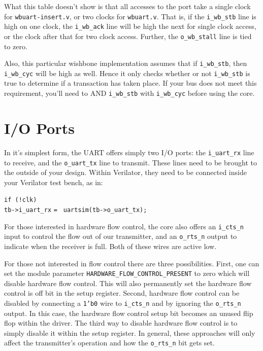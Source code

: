 \documentclass{gqtekspec}
\begin{document}
What this table doesn't show is that all accesses to the port take a single
clock for {\tt wbuart-insert.v}, or two clocks for {\tt wbuart.v}.  That is, if
the {\tt i\_wb\_stb} line is high on one clock, the {\tt i\_wb\_ack} line will
be high the next for single clock access, or the clock after that for two
clock access.  Further, the {\tt o\_wb\_stall} line is tied to zero.

Also, this particular wishbone implementation assumes that if {\tt i\_wb\_stb},
then {\tt i\_wb\_cyc} will be high as well.  Hence it only checks whether or not
{\tt i\_wb\_stb} is true to determine if a transaction has taken place.  If your
bus does not meet this requirement, you'll need to AND {\tt i\_wb\_stb} with
{\tt i\_wb\_cyc} before using the core.

\chapter{I/O Ports}\label{ch:ioports}

In it's simplest form, the UART offers simply two I/O ports: the
{\tt i\_uart\_rx} line to receive, and the {\tt o\_uart\_tx} line to transmit.
These lines need to be brought to the outside of your design.  Within
Verilator, they need to be connected inside your Verilator test bench, as in:
\begin{tabbing}
{\tt if (!clk)} \= \\
\> {\tt tb->i\_uart\_rx} {\tt = } {\tt uartsim(tb->o\_uart\_tx);}
\end{tabbing}

For those interested in hardware flow control, the core also offers an
{\tt i\_cts\_n} input to control the flow out of our transmitter, and an
{\tt o\_rts\_n} output to indicate when the receiver is full.  Both of these
wires are active low.

For those not interested in flow control there are three
possibilities.  First, one can set the module parameter
{\tt HARDWARE\_FLOW\_CONTROL\_PRESENT} to zero which will disable hardware
flow control.  This will also permanently set the hardware flow control is off
bit in the setup register.  Second, hardware flow control can be disabled by
connecting a {\tt 1'b0} wire to {\tt i\_cts\_n} and by ignoring the
{\tt o\_rts\_n} output.  In this case, the hardware flow control setup bit
becomes an unused flip flop within the driver. The third way to disable
hardware flow control is to simply disable it within the setup register.  In
general, these approaches will only affect the transmitter's operation and how
the {\tt o\_rts\_n} bit gets set.
\end{document}
